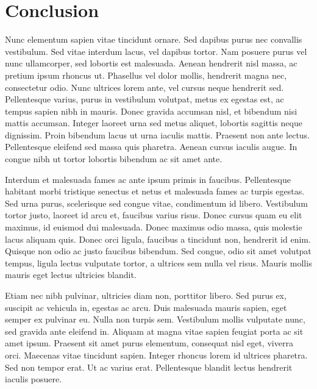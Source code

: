 \section{Conclusion}

Nunc elementum sapien vitae tincidunt ornare. Sed dapibus purus nec convallis vestibulum. Sed vitae interdum lacus, vel dapibus tortor. Nam posuere purus vel nunc ullamcorper, sed lobortis est malesuada. Aenean hendrerit nisl massa, ac pretium ipsum rhoncus ut. Phasellus vel dolor mollis, hendrerit magna nec, consectetur odio. Nunc ultrices lorem ante, vel cursus neque hendrerit sed. Pellentesque varius, purus in vestibulum volutpat, metus ex egestas est, ac tempus sapien nibh in mauris. Donec gravida accumsan nisl, et bibendum nisi mattis accumsan. Integer laoreet urna sed metus aliquet, lobortis sagittis neque dignissim. Proin bibendum lacus ut urna iaculis mattis. Praesent non ante lectus. Pellentesque eleifend sed massa quis pharetra. Aenean cursus iaculis augue. In congue nibh ut tortor lobortis bibendum ac sit amet ante.

Interdum et malesuada fames ac ante ipsum primis in faucibus. Pellentesque habitant morbi tristique senectus et netus et malesuada fames ac turpis egestas. Sed urna purus, scelerisque sed congue vitae, condimentum id libero. Vestibulum tortor justo, laoreet id arcu et, faucibus varius risus. Donec cursus quam eu elit maximus, id euismod dui malesuada. Donec maximus odio massa, quis molestie lacus aliquam quis. Donec orci ligula, faucibus a tincidunt non, hendrerit id enim. Quisque non odio ac justo faucibus bibendum. Sed congue, odio sit amet volutpat tempus, ligula lectus vulputate tortor, a ultrices sem nulla vel risus. Mauris mollis mauris eget lectus ultricies blandit.

Etiam nec nibh pulvinar, ultricies diam non, porttitor libero. Sed purus ex, suscipit ac vehicula in, egestas ac arcu. Duis malesuada mauris sapien, eget semper ex pulvinar eu. Nulla non turpis sem. Vestibulum mollis vulputate nunc, sed gravida ante eleifend in. Aliquam at magna vitae sapien feugiat porta ac sit amet ipsum. Praesent sit amet purus elementum, consequat nisl eget, viverra orci. Maecenas vitae tincidunt sapien. Integer rhoncus lorem id ultrices pharetra. Sed non tempor erat. Ut ac varius erat. Pellentesque blandit lectus hendrerit iaculis posuere.
